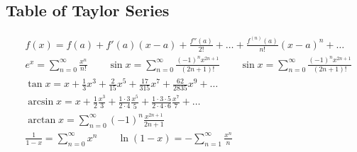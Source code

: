 \documentclass[12pt]{article}
\begin{document}
\subsection{Table of Taylor Series}
\begin{align}\nonumber
& f(x) = f(a) + f'(a)(x-a) + \frac{f''(a)}{2!} + \dots 
+ \frac{f^{(n)}(a)}{n!}(x-a)^n + \dots
\\\nonumber
& e^x = \sum_{n=0}^\infty \frac{x^n}{n!}
\qquad \sin x = \sum_{n=0}^\infty \frac{(-1)^n x^{2n+1}}{(2n+1)!}
\qquad \sin x = \sum_{n=0}^\infty \frac{(-1)^n x^{2n+1}}{(2n+1)!}
\\\nonumber
&\tan x = x + \frac{1}{3}x^3 + \frac{2}{15}x^5 + \frac{17}{315}x^7
+ \frac{62}{2835}x^9 + \dots
\\\nonumber
&\arcsin x = x + \frac{1}{2}\frac{x^3}{3} 
+ \frac{1\cdot 3}{2\cdot 4}\frac{x^5}{5}
+ \frac{1\cdot3\cdot5}{2\cdot4\cdot6}\frac{x^7}{7} + \dots
\\\nonumber
&\arctan x = \sum_{n=0}^\infty (-1)^n \frac{x^{2n+1}}{2n+1}
\\\nonumber
&\frac{1}{1-x} = \sum_{n=0}^\infty x^n
\qquad \ln(1-x) = -\sum_{n=1}^\infty \frac{x^n}{n}
\end{align}
\end{document}
